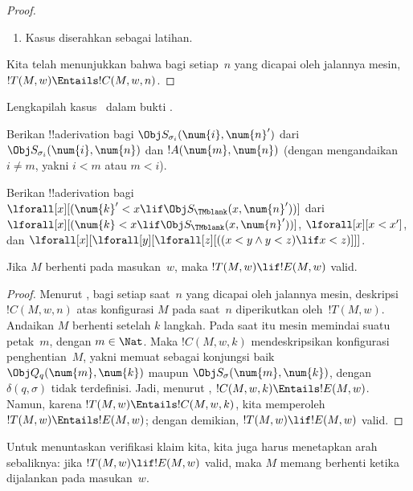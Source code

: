 \documentclass[../../../include/open-logic-section]{subfiles}
\begin{document}
\begin{proof}
\begin{enumerate}
\item Kasus  diserahkan sebagai latihan.
\end{enumerate}
Kita telah menunjukkan bahwa bagi setiap~$n$ yang dicapai oleh jalannya mesin,
$!T(M, w) \Entails !C(M, w, n)$.
\end{proof}

\begin{prob}
Lengkapilah kasus~ dalam bukti
.
\end{prob}

\begin{prob}
Berikan !!a{derivation} bagi $\Obj S_{\sigma_i}(\num{i}, \num{n}')$ dari
$\Obj S_{\sigma_i}(\num{i}, \num{n})$ dan
$!A(\num{m}, \num{n})$ (dengan mengandaikan $i \neq m$, yakni $i < m$ atau
$m < i$).
\end{prob}

\begin{prob}
Berikan !!a{derivation} bagi $\lforall[x][(\num{k}' < x \lif \Obj
  S_\TMblank(x, \num{n}'))]$ dari $\lforall[x][(\num{k} < x \lif \Obj
  S_\TMblank(x, \num{n}'))]$, $\lforall[x][x < x']$, dan
$\lforall[x][\lforall[y][\lforall[z][ ((x < y \land y < z) \lif x <
      z)]]]$.
\end{prob}


\begin{lem}
Jika $M$ berhenti pada masukan~$w$, maka $!T(M, w) \lif
!E(M, w)$ valid.
\end{lem}

\begin{proof}
Menurut , bagi setiap saat~$n$ yang dicapai oleh jalannya
mesin, deskripsi~$!C(M, w, n)$ atas konfigurasi $M$ pada saat~$n$
diperikutkan oleh~$!T(M, w)$. Andaikan $M$ berhenti setelah $k$ langkah.
Pada saat itu mesin memindai suatu petak~$m$, dengan $m \in \Nat$.
Maka $!C(M, w, k)$ mendeskripsikan konfigurasi penghentian~$M$, yakni memuat
sebagai konjungsi baik $\Obj Q_q(\num{m}, \num{k})$ maupun
$\Obj S_\sigma(\num{m}, \num{k})$, dengan $\delta(q,\sigma)$ tidak
terdefinisi. Jadi, menurut ,
$!C(M, w, k) \Entails !E(M,w)$. Namun, karena
$!T(M, w) \Entails !C(M, w, k)$, kita memperoleh
$!T(M, w) \Entails !E(M, w)$; dengan demikian,
$!T(M, w) \lif !E(M, w)$ valid.
\end{proof}


\begin{explain}
Untuk menuntaskan verifikasi klaim kita, kita juga harus menetapkan arah
sebaliknya: jika $!T(M, w) \lif !E(M, w)$ valid, maka $M$ memang berhenti
ketika dijalankan pada masukan~$w$.
\end{explain}
\end{document}
